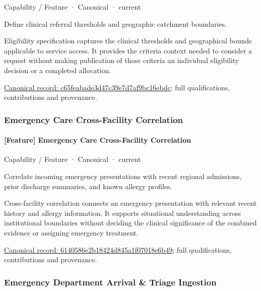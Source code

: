 \label{element:c65feabade3d47c39e7d7af9bc16ebdc}
{\small Capability / Feature · Canonical · current}\par

Define clinical referral thresholds and geographic catchment boundaries.



Eligibility specification captures the clinical thresholds and geographical bounds applicable to service access. It provides the criteria context needed to consider a request without making publication of those criteria an individual eligibility decision or a completed allocation.


{\footnotesize \href{../../../../continuum/strategy/capability/feature/c65feabade3d47c39e7d7af9bc16ebdc.md}{Canonical record: c65feabade3d47c39e7d7af9bc16ebdc}; full qualifications, contributions and provenance.}\par
\subsubsection{Emergency Care Cross-Facility Correlation}

\paragraph{[Feature] Emergency Care Cross-Facility Correlation}

\label{element:6140586e2b18424d845a1f07018e6b49}
{\small Capability / Feature · Canonical · current}\par

Correlate incoming emergency presentations with recent regional admissions, prior discharge summaries, and known allergy profiles.



Cross-facility correlation connects an emergency presentation with relevant recent history and allergy information. It supports situational understanding across institutional boundaries without deciding the clinical significance of the combined evidence or assigning emergency treatment.


{\footnotesize \href{../../../../continuum/strategy/capability/feature/6140586e2b18424d845a1f07018e6b49.md}{Canonical record: 6140586e2b18424d845a1f07018e6b49}; full qualifications, contributions and provenance.}\par
\subsubsection{Emergency Department Arrival \& Triage Ingestion}

